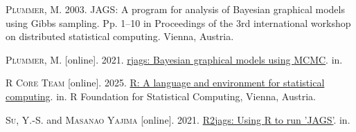 \documentclass[
  13,
  letterpaper,
]{report}
\newlength{\cslhangindent}
\newenvironment{CSLReferences}[2] %
 {\begin{list}{}{%
  \setlength{\itemindent}{0pt}
  \setlength{\leftmargin}{0pt}
  \setlength{\parsep}{0pt}
  \ifodd #1
   \setlength{\leftmargin}{\cslhangindent}
   \setlength{\itemindent}{-1\cslhangindent}
  \fi
  \setlength{\itemsep}{#2\baselineskip}}}
 {\end{list}}
\begin{document}
\protect{}\label{refs}
\begin{CSLReferences}{1}{1}
\textsc{Plummer, M.} 2003. {JAGS}: A program for analysis of {B}ayesian
graphical models using {G}ibbs sampling. Pp. 1--10 in Proceedings of the
3rd international workshop on distributed statistical computing. Vienna,
Austria.

\textsc{Plummer, M.} {[}online{]}. 2021.
\href{https://CRAN.R-project.org/package=rjags}{{r}jags: {B}ayesian
graphical models using {MCMC}}. in.

\textsc{R Core Team} {[}online{]}. 2025.
\href{https://www.R-project.org/}{R: A language and environment for
statistical computing}. in. R Foundation for Statistical Computing,
Vienna, Austria.

\textsc{Su, Y.-S.} and \textsc{Masanao Yajima} {[}online{]}. 2021.
\href{https://CRAN.R-project.org/package=R2jags}{{R2}jags: Using {R} to
run '{JAGS}'}. in.

\end{CSLReferences}
\end{document}
